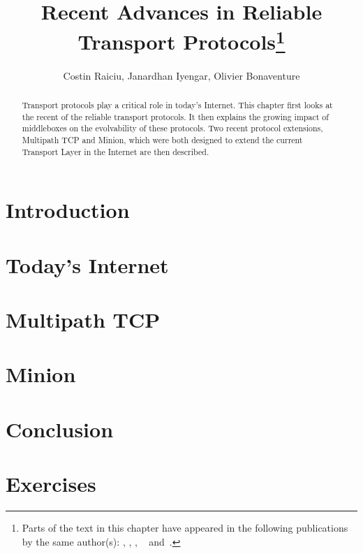 \documentclass{article}
\title{Recent Advances in Reliable Transport Protocols\footnote{
Parts of the text in this chapter have appeared in the following
 publications by the same author(s): \cite{login}, \cite{mptcp-cc},
 \cite{raiciu2012hard}, ~\cite{nowlan12fitting} 
and~\cite{iyengar10minion}.}
}
\author{Costin Raiciu, Janardhan Iyengar, Olivier Bonaventure}
\date{}
\begin{document}
\pagestyle{empty}

\maketitle

\thispagestyle{empty}

\begin{abstract}
Transport protocols play a critical role in today's Internet. This
chapter first looks at the recent of the reliable transport
protocols. It then explains the growing impact of middleboxes on the
evolvability of these protocols. 
Two recent protocol extensions,
Multipath TCP and Minion,
which were both designed to extend the current Transport Layer 
in the Internet
are then described.
\end{abstract}


\section{Introduction}




\section{Today's Internet}\label{section:today}





%

\section{Multipath TCP}\label{section:mptcp}




\section{Minion}\label{section:minion}





%

\section{Conclusion}\label{section:conclusion}




%




\appendix

\section{Exercises}


\end{document}
